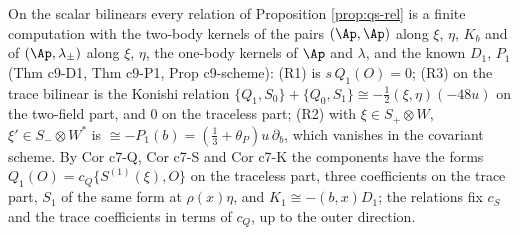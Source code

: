 \begin{remark}
\label{rem:qs-bilinears}
On the scalar bilinears every relation of Proposition \ref{prop:qs-rel} is a finite computation with the two-body kernels of the pairs $(\Ap,\Ap)$ along $\xi$, $\eta$, $K_b$ and of $(\Ap,\lambda_\pm)$ along $\xi$, $\eta$, the one-body kernels of $\Ap$ and $\lambda$, and the known $D_1$, $P_1$ (Thm c9-D1, Thm c9-P1, Prop c9-scheme): (R1) is $s\,Q_1(O)=0$; (R3) on the trace bilinear is the Konishi relation $\{Q_1,S_0\}+\{Q_0,S_1\}\cong-\tfrac12(\xi,\eta)(-48u)$ on the two-field part, and $0$ on the traceless part; (R2) with $\xi\in S_+\otimes W$, $\xi'\in S_-\otimes W^*$ is $\cong-P_1(b)=(\tfrac13+\theta_P)u\,\partial_b$, which vanishes in the covariant scheme. By Cor c7-Q, Cor c7-S and Cor c7-K the components have the forms $Q_1(O)=c_Q\{S^{(1)}(\xi),O\}$ on the traceless part, three coefficients on the trace part, $S_1$ of the same form at $\rho(x)\eta$, and $K_1\cong-(b,x)D_1$; the relations fix $c_S$ and the trace coefficients in terms of $c_Q$, up to the outer direction.
\end{remark}
